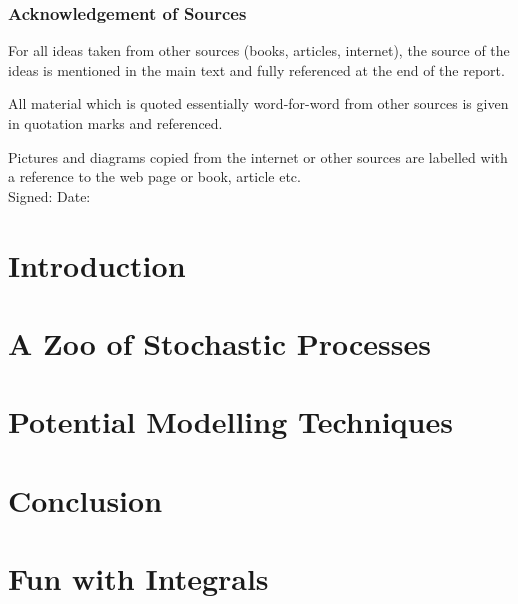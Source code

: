 \documentclass{report}
\begin{document}


\newpage
\subsection*{Acknowledgement of Sources}
For all ideas taken from other sources (books, articles, internet), the source of the ideas is mentioned in the main text and fully referenced at the end of the report.

All material which is quoted essentially word-for-word from other sources is given in quotation marks and referenced.

Pictures and diagrams copied from the internet or other sources are labelled with a reference to the web page or book, article etc.
\\[20pt]
Signed: \dotfill Date: \dotfill

\newpage

\tableofcontents

\chapter{Introduction}



\chapter{A Zoo of Stochastic Processes}\label{zoo}



\chapter{Potential Modelling Techniques}\label{techniques}



\chapter{Conclusion}



\appendix
\chapter{Fun with Integrals}\label{fun}


\end{document}
